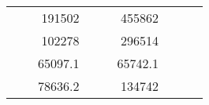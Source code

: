 \begin{table}[H]
\begin{tabular}{|ccrccrccc}
\multicolumn{1}{|c|}{\cellcolor[HTML]{FFFFC7}}                                & \multicolumn{1}{c|}{\cellcolor[HTML]{DDFDFF}}                      & \multicolumn{1}{r|}{\cellcolor[HTML]{DAE8FC}191502}    & \multicolumn{1}{c|}{\cellcolor[HTML]{FFFFC7}}                                & \multicolumn{1}{c|}{\cellcolor[HTML]{DDFDFF}}                       & \multicolumn{1}{r|}{\cellcolor[HTML]{DDFDFF}455862}    &                                                                              &                                                                    &                                                        \\ \cline{3-3} \cline{6-6}
\multicolumn{1}{|c|}{\cellcolor[HTML]{FFFFC7}}                                & \multicolumn{1}{c|}{\cellcolor[HTML]{DDFDFF}}                      & \multicolumn{1}{r|}{\cellcolor[HTML]{DDFDFF}102278}    & \multicolumn{1}{c|}{\cellcolor[HTML]{FFFFC7}}                                & \multicolumn{1}{c|}{\cellcolor[HTML]{DDFDFF}}                       & \multicolumn{1}{r|}{\cellcolor[HTML]{DAE8FC}296514}    &                                                                              &                                                                    &                                                        \\ \cline{3-3} \cline{6-6}
\multicolumn{1}{|c|}{\cellcolor[HTML]{FFFFC7}}                                & \multicolumn{1}{c|}{\cellcolor[HTML]{DDFDFF}}                      & \multicolumn{1}{r|}{\cellcolor[HTML]{DAE8FC}65097.1}   & \multicolumn{1}{c|}{\cellcolor[HTML]{FFFFC7}}                                & \multicolumn{1}{c|}{\cellcolor[HTML]{DDFDFF}}                       & \multicolumn{1}{r|}{\cellcolor[HTML]{DDFDFF}65742.1}   &                                                                              &                                                                    &                                                        \\ \cline{3-3} \cline{6-6}
\multicolumn{1}{|c|}{\cellcolor[HTML]{FFFFC7}}                                & \multicolumn{1}{c|}{\cellcolor[HTML]{DDFDFF}}                      & \multicolumn{1}{r|}{\cellcolor[HTML]{DDFDFF}78636.2}   & \multicolumn{1}{c|}{\cellcolor[HTML]{FFFFC7}}                                & \multicolumn{1}{c|}{\cellcolor[HTML]{DDFDFF}}                       & \multicolumn{1}{r|}{\cellcolor[HTML]{DAE8FC}134742}    &                                                                              &                                                                    &                                                        \\ \cline{3-3} \cline{6-6}

\end{tabular}
\end{table}
